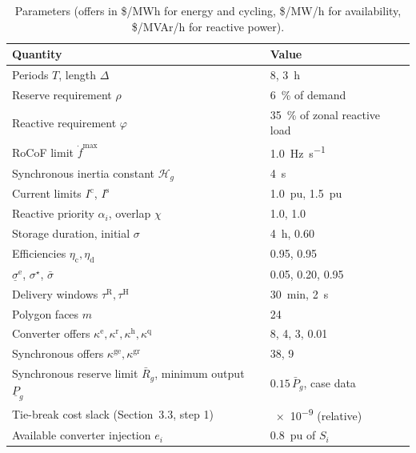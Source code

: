 \documentclass[11pt,a4paper]{article}
\newcommand{\pu}{\ensuremath{\mathrm{pu}}}
\begin{document}
\begin{table}[h]
  \caption{Parameters (offers in \$/MWh for energy and cycling, \$/MW/h for
  availability, \$/MVAr/h for reactive power).}
  \label{tab:parameters}
  \centering
  \begin{tabular}{@{}l l@{}}
    \toprule
    Quantity & Value \\
    \midrule
    Periods $T$, length $\Delta$ & 8, \SI{3}{\hour} \\
    Reserve requirement $\rho$ & \SI{6}{\percent} of demand \\
    Reactive requirement $\varphi$ & \SI{35}{\percent} of zonal reactive load \\
    RoCoF limit $\dot{f}^{\max}$ & \SI{1.0}{\hertz\per\second} \\
    Synchronous inertia constant $\mathcal{H}_g$ & \SI{4}{\second} \\
    Current limits $I^{\mathrm{c}}$, $I^{\mathrm{s}}$
      & \SI{1.0}{\pu}, \SI{1.5}{\pu} \\
    Reactive priority $\alpha_i$, overlap $\chi$ & \num{1.0}, \num{1.0} \\
    Storage duration, initial $\sigma$ & \SI{4}{\hour}, \num{0.60} \\
    Efficiencies $\eta_{\mathrm{c}}, \eta_{\mathrm{d}}$ & \num{0.95}, \num{0.95} \\
    $\underline{\sigma}^{\mathrm{e}}$, $\sigma^{\star}$, $\bar{\sigma}$
      & \num{0.05}, \num{0.20}, \num{0.95} \\
    Delivery windows $\tau^{\mathrm{R}}, \tau^{\mathrm{H}}$
      & \SI{30}{\minute}, \SI{2}{\second} \\
    Polygon faces $m$ & 24 \\
    Converter offers
      $\kappa^{\mathrm{e}}, \kappa^{\mathrm{r}}, \kappa^{\mathrm{h}},
      \kappa^{\mathrm{q}}$ & 8, 4, 3, 0.01 \\
    Synchronous offers
      $\kappa^{\mathrm{ge}}, \kappa^{\mathrm{gr}}$ & 38, 9 \\
    Synchronous reserve limit $\bar{R}_g$, minimum output
      $\underline{P}_g$ & $0.15\,\bar{P}_g$, case data \\
    Tie-break cost slack (Section~3.3, step 1) & \num{e-9} (relative) \\
    Available converter injection $e_i$ & \SI{0.8}{\pu} of $S_i$ \\
    \bottomrule
  \end{tabular}
\end{table}
\end{document}
